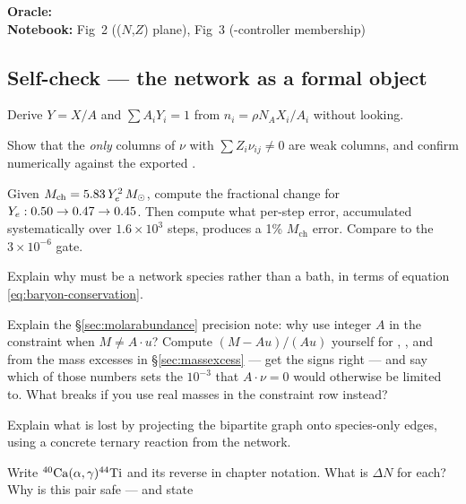 \begin{repopointer}
\textbf{Oracle:} \\
\textbf{Notebook:}  Fig~2 (($N$,$Z$) plane), Fig~3
(\Ye{}-controller membership)
\end{repopointer}

\subsection*{Self-check --- the network as a formal object}
\label{sec:selfcheck-network}

\begin{selfcheck}
\item Derive $Y = X/A$ and $\sum A_i Y_i = 1$ from
      $n_i = \rho N_A X_i/A_i$ without looking.
\item Show that the \emph{only} columns of $\nu$ with
      $\sum Z_i \nu_{ij} \neq 0$ are weak columns, and confirm numerically
      against the exported .
\item Given $M_{\mathrm{ch}} = 5.83\,Y_e^2\,\Msun$, compute the fractional
      change for $\Ye: 0.50 \to 0.47 \to 0.45$. Then compute what per-step \Ye{}
      error, accumulated systematically over $1.6\times10^{3}$ steps, produces a
      1\% $M_{\mathrm{ch}}$ error. Compare to the $3\times10^{-6}$ gate.
\item Explain why  must be a network species rather than a bath, in
      terms of equation \eqref{eq:baryon-conservation}.
\item Explain the \S\ref{sec:molarabundance} precision note: why use integer $A$
      in the constraint when $M \neq A\cdot u$? Compute $(M - A u)/(A u)$
      yourself for , , and  from the mass
      excesses in \S\ref{sec:massexcess} --- get the signs right --- and say
      which of those numbers sets the $10^{-3}$ that $A\cdot\nu = 0$ would
      otherwise be limited to. What breaks if you use real masses in the
      constraint row instead?
\item Explain what is lost by projecting the bipartite graph onto species-only
      edges, using a concrete ternary reaction from the network.
\item Write $\nuc{Ca}{40}(\alpha,\gamma)\nuc{Ti}{44}$ and its reverse in chapter
      notation. What is $\Delta N$ for each? Why is this pair safe --- and state

\end{selfcheck}
